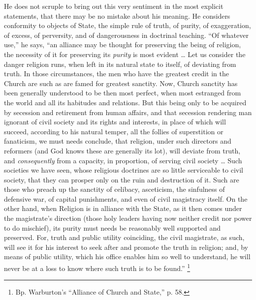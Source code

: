 He does not scruple to bring out this very sentiment in the most
explicit statements, that there may be no mistake about his meaning.
He considers conformity to objects of State, the simple rule of truth,
of purity, of exaggeration, of excess, of perversity, and of
dangerousness in doctrinal teaching. ``Of whatever use,'' he
says, ``an alliance may be thought for preserving the being of
religion, the necessity of it for preserving its \emph{purity} is most
evident … Let us consider the danger religion runs, when left in its
natural state to itself, of deviating from truth. In those
circumstances, the men who have the greatest credit in the Church are
such as are famed for greatest sanctity. Now, Church sanctity has been
generally understood to be then most perfect, when most estranged from
the world and all its habitudes and relations. But this being only to
be acquired by secession and retirement from human affairs, and that
secession rendering man ignorant of civil society and its rights and
interests, in place of which will succeed, according to his natural
temper, all the follies of superstition or fanaticism, we must needs
conclude, that religion, under such directors and reformers (and God
knows these are generally its lot), will deviate from truth, and \emph{consequently}
from a capacity, in proportion, of serving civil society … Such
societies we have seen, whose religious doctrines are so little
serviceable to civil society, that they can prosper only on the ruin
and destruction of it. Such are those who preach up the sanctity of
celibacy, asceticism, the sinfulness of defensive war, of capital
punishments, and even of civil magistracy itself. On the other hand,
when Religion is in alliance with the State, as it then comes under
the magistrate's direction (those holy leaders having now neither
credit nor power to do mischief), its purity must needs be reasonably
well supported and preserved. For, truth and public utility
coinciding, the civil magistrate, as such, will see it for his
interest to seek after and promote the truth in religion; and, by
means of public utility, which his office enables him so well to
understand, he will never be at a loss to know where such truth is to
be found.'' \footnote{Bp. Warburton's ``Alliance of Church and
State,'' p. 58.}

